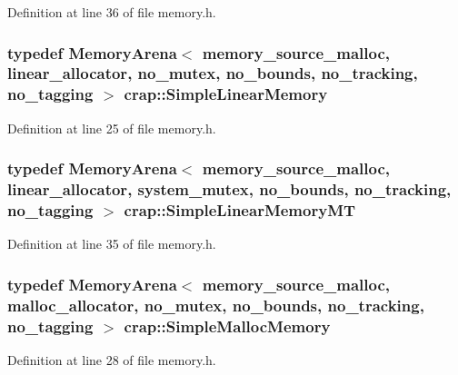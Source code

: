 Definition at line 36 of file memory.\+h.

\hypertarget{namespacecrap_a15a43bda87dfd4f909e30e1df3b1cee7}{}
\subsubsection[{Simple\+Linear\+Memory}]{\setlength{\rightskip}{0pt plus 5cm}typedef {\bf Memory\+Arena}$<$ {\bf memory\+\_\+source\+\_\+malloc}, {\bf linear\+\_\+allocator}, {\bf no\+\_\+mutex}, {\bf no\+\_\+bounds}, {\bf no\+\_\+tracking}, {\bf no\+\_\+tagging} $>$ {\bf crap\+::\+Simple\+Linear\+Memory}}\label{namespacecrap_a15a43bda87dfd4f909e30e1df3b1cee7}


Definition at line 25 of file memory.\+h.

\hypertarget{namespacecrap_a98a843d877d8c0558c40574d0a0019e3}{}
\subsubsection[{Simple\+Linear\+Memory\+M\+T}]{\setlength{\rightskip}{0pt plus 5cm}typedef {\bf Memory\+Arena}$<$ {\bf memory\+\_\+source\+\_\+malloc}, {\bf linear\+\_\+allocator}, {\bf system\+\_\+mutex}, {\bf no\+\_\+bounds}, {\bf no\+\_\+tracking}, {\bf no\+\_\+tagging} $>$ {\bf crap\+::\+Simple\+Linear\+Memory\+M\+T}}\label{namespacecrap_a98a843d877d8c0558c40574d0a0019e3}


Definition at line 35 of file memory.\+h.

\hypertarget{namespacecrap_a8711640793bf2ed760185fe66c8e3d03}{}
\subsubsection[{Simple\+Malloc\+Memory}]{\setlength{\rightskip}{0pt plus 5cm}typedef {\bf Memory\+Arena}$<$ {\bf memory\+\_\+source\+\_\+malloc}, {\bf malloc\+\_\+allocator}, {\bf no\+\_\+mutex}, {\bf no\+\_\+bounds}, {\bf no\+\_\+tracking}, {\bf no\+\_\+tagging} $>$ {\bf crap\+::\+Simple\+Malloc\+Memory}}\label{namespacecrap_a8711640793bf2ed760185fe66c8e3d03}


Definition at line 28 of file memory.\+h.

